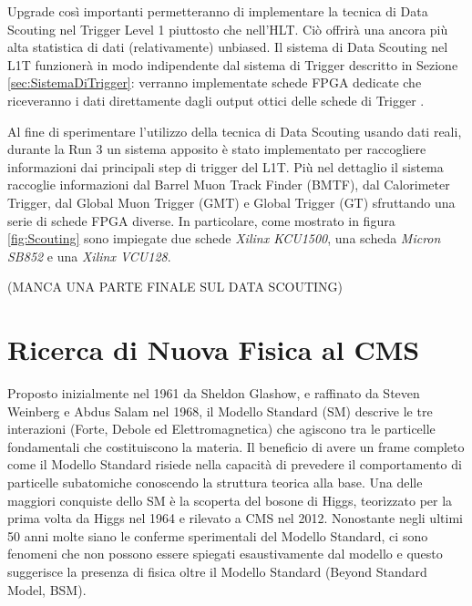 Upgrade così importanti permetteranno di implementare la tecnica di Data Scouting nel Trigger Level 1 piuttosto che nell'HLT. Ciò offrirà una ancora più alta statistica di dati (relativamente) unbiased.\newline
Il sistema di Data Scouting nel L1T funzionerà in modo indipendente dal sistema di Trigger descritto in Sezione \ref{sec:SistemaDiTrigger}: verranno implementate schede FPGA dedicate che riceveranno i dati direttamente dagli output ottici delle schede di Trigger \cite{MasterThesisNicLai}.

Al fine di sperimentare l'utilizzo della tecnica di Data Scouting usando dati reali, durante la Run 3 un sistema apposito è stato implementato per raccogliere informazioni dai principali step di trigger del L1T. Più nel dettaglio il sistema raccoglie informazioni dal Barrel Muon Track Finder (BMTF), dal Calorimeter Trigger, dal Global Muon Trigger (GMT) e Global Trigger (GT) sfruttando una serie di schede FPGA diverse. In particolare, come mostrato in figura \ref{fig:Scouting} sono impiegate due schede \textit{Xilinx KCU1500}, una scheda \textit{Micron SB852} e una \textit{Xilinx VCU128}. 


(MANCA UNA PARTE FINALE SUL DATA SCOUTING)




\section{Ricerca di Nuova Fisica al CMS}
\label{sec:NewPhysics}

Proposto inizialmente nel 1961 da Sheldon Glashow, e raffinato da Steven Weinberg e Abdus Salam nel 1968, il Modello Standard (SM) descrive le tre interazioni (Forte, Debole ed Elettromagnetica) che agiscono tra le particelle fondamentali che costituiscono la materia. Il beneficio di avere un frame completo come il Modello Standard risiede nella capacità di prevedere il comportamento di particelle subatomiche conoscendo la struttura teorica alla base. Una delle maggiori conquiste dello SM è la scoperta del bosone di Higgs, teorizzato per la prima volta da Higgs nel 1964 e rilevato a CMS nel 2012. \newline
Nonostante negli ultimi 50 anni molte siano le conferme sperimentali del Modello Standard, ci sono fenomeni che non possono essere spiegati esaustivamente dal modello e questo suggerisce la presenza di fisica oltre il Modello Standard (Beyond Standard Model, BSM).

